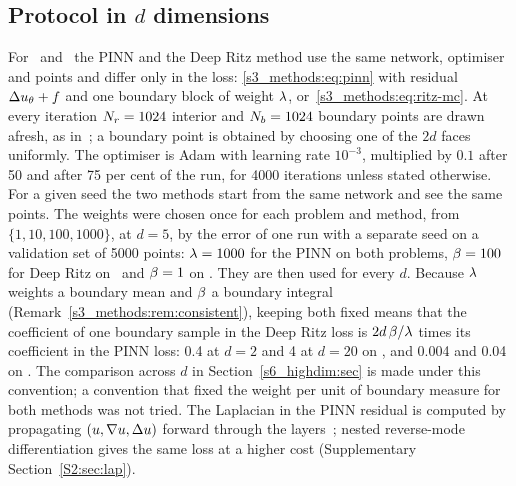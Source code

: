 \begin{remark}\label{s3_methods:rem:consistent}
\StmtConsistent
\end{remark}

\subsection{Protocol in \texorpdfstring{$d$}{d} dimensions}\label{s3_methods:sec:highdim}

For \Pone\ and \Ptwo\ the PINN and the Deep Ritz method use the same network, optimiser
and points and differ only in the loss: \eqref{s3_methods:eq:pinn} with residual
$\Delta u_{\theta}+f$ and one boundary block of weight $\lambda$,
or~\eqref{s3_methods:eq:ritz-mc}. At every iteration $N_{r}=1024$ interior and $N_{b}=1024$
boundary points are drawn afresh, as in~\citep{sirignano2018}; a boundary point is
obtained by choosing one of the $2d$ faces uniformly. The optimiser is Adam with learning
rate $10^{-3}$, multiplied by $0.1$ after 50 and after 75 per cent of the run, for 4000
iterations unless stated otherwise. For a given seed the two methods start from the same
network and see the same points.
The weights were chosen once for each problem and method, from $\{1,10,100,1000\}$, at
$d=5$, by the error of one run with a separate seed on a validation set of 5000 points:
$\lambda=1000$ for the PINN on both problems, $\beta=100$ for Deep Ritz on \Pone\ and $\beta=1$
on \Ptwo. They are then used for every $d$. Because $\lambda$ weights a boundary mean and $\beta$
a boundary integral (Remark~\ref{s3_methods:rem:consistent}), keeping both fixed means that
the coefficient of one boundary sample in the Deep Ritz loss is $2d\,\beta/\lambda$ times its
coefficient in the PINN loss: 0.4 at $d=2$ and 4 at $d=20$ on \Pone, and 0.004 and 0.04 on
\Ptwo. The comparison across $d$ in Section~\ref{s6_highdim:sec} is made under this
convention; a convention that fixed the weight per unit of boundary measure for both
methods was not tried.
The Laplacian in the PINN residual is computed by propagating $(u,\nabla u,\Delta u)$ forward
through the layers~\citep{li2024forward}; nested reverse-mode differentiation gives the same
loss at a higher cost (Supplementary Section~\ref{S2:sec:lap}).

